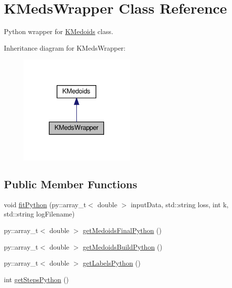 \hypertarget{classKMedsWrapper}{}\section{K\+Meds\+Wrapper Class Reference}
\label{classKMedsWrapper}


Python wrapper for \hyperlink{classKMedoids}{K\+Medoids} class.  




Inheritance diagram for K\+Meds\+Wrapper\+:
\nopagebreak
\begin{figure}[H]
\begin{center}
\leavevmode
\includegraphics[width=164pt]{classKMedsWrapper__inherit__graph}
\end{center}
\end{figure}
\subsection*{Public Member Functions}
\begin{DoxyCompactItemize}
\item 
void \hyperlink{classKMedsWrapper_a84e7535d6cdd70187c774811a210adc6}{fit\+Python} (py\+::array\+\_\+t$<$ double $>$ input\+Data, std\+::string loss, int k, std\+::string log\+Filename)
\item 
py\+::array\+\_\+t$<$ double $>$ \hyperlink{classKMedsWrapper_ae825241c43b8bf92912eb59cd12ae1c5}{get\+Medoids\+Final\+Python} ()
\item 
py\+::array\+\_\+t$<$ double $>$ \hyperlink{classKMedsWrapper_af272debff6f3b31490d20b8dc7bec322}{get\+Medoids\+Build\+Python} ()
\item 
py\+::array\+\_\+t$<$ double $>$ \hyperlink{classKMedsWrapper_aba0a92e75230b7853fd533657ead656e}{get\+Labels\+Python} ()
\item 
int \hyperlink{classKMedsWrapper_a25ac2830354eeae7963cdec34d0137e8}{get\+Steps\+Python} ()
\end{DoxyCompactItemize}



